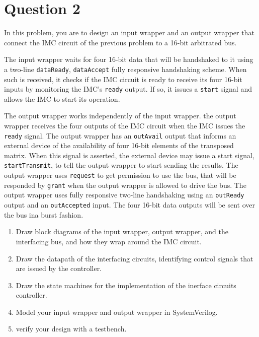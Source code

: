 \documentclass[../main.tex]{subfiles}
\begin{document}
\newpage

\section{Question 2}

In this problem, you are to design an input wrapper and an output wrapper that connect the IMC circuit of the previous problem to a 16-bit arbitrated bus.

The input wrapper waits for four 16-bit data that will be handshaked to it using a two-line \texttt{dataReady}, \texttt{dataAccept} fully responsive handshaking scheme. When such is received, it checks if the IMC circuit is ready to receive its four 16-bit inputs by monitoring the IMC's \texttt{ready} output. If so, it issues a \texttt{start} signal and allows the IMC to start its operation.

The output wrapper works independently of the input wrapper. the output wrapper receives the four outputs of the IMC circuit when the IMC issues the \texttt{ready} signal. The output wrapper has an \texttt{outAvail} output that informs an external device of the availability of four 16-bit elements of the transposed matrix. When this signal is asserted, the external device may issue a start signal, \texttt{startTransmit}, to tell the output wrapper to start sending the results. The output wrapper uses \texttt{request} to get permission to use the bus, that will be responded by \texttt{grant} when the output wrapper is allowed to drive the bus. The output wrapper uses fully responsive two-line handshaking using an \texttt{outReady} output and an \texttt{outAccepted} input. The four 16-bit data outputs will be sent over the bus ina  burst fashion.

\begin{enumerate}
    \item Draw block diagrams of the input wrapper, output wrapper, and the interfacing bus, and how they wrap around the IMC circuit.
    \item Draw the datapath of the interfacing circuits, identifying control signals that are issued by the controller.
    \item Draw the state machines for the implementation of the inerface circuits controller.
    \item Model your input wrapper and output wrapper in SystemVerilog.
    \item verify your design with a testbench.
\end{enumerate}
\end{document}
